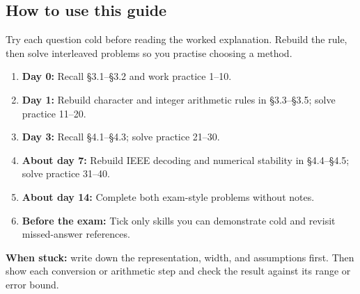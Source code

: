 \documentclass[11pt]{article}
\begin{document}
\begin{keepsection}
\section{How to use this guide}

Try each question cold before reading the worked explanation. Rebuild the rule, then solve interleaved problems so you practise choosing a method.

\begin{enumerate}
\item \textbf{Day 0:} Recall §3.1–§3.2 and work practice 1–10.
\item \textbf{Day 1:} Rebuild character and integer arithmetic rules in §3.3–§3.5; solve practice 11–20.
\item \textbf{Day 3:} Recall §4.1–§4.3; solve practice 21–30.
\item \textbf{About day 7:} Rebuild IEEE decoding and numerical stability in §4.4–§4.5; solve practice 31–40.
\item \textbf{About day 14:} Complete both exam-style problems without notes.
\item \textbf{Before the exam:} Tick only skills you can demonstrate cold and revisit missed-answer references.
\end{enumerate}

\begin{notebox}\textbf{When stuck:} write down the representation, width, and assumptions first. Then show each conversion or arithmetic step and check the result against its range or error bound.\end{notebox}
\end{keepsection}
\end{document}
